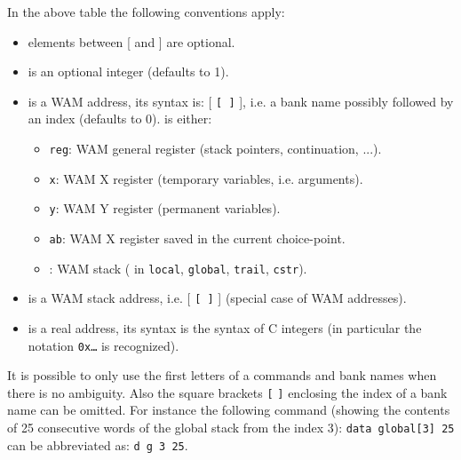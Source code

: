 In the above table the following conventions apply:

\begin{itemize}

\item elements between [ and ] are optional.

\item {} is an optional integer (defaults to 1).

\item {} is a WAM address, its syntax is:
 [ \texttt{[  ]} ], i.e. a bank name
possibly followed by an index (defaults to 0). 
is either:

\begin{itemize}

\item \texttt{reg}: WAM general register (stack pointers, continuation,
...).

\item \texttt{x}: WAM X register (temporary variables, i.e. arguments).

\item \texttt{y}: WAM Y register (permanent variables).

\item \texttt{ab}: WAM X register saved in the current choice-point.

\item {}: WAM stack
( in \texttt{local}, \texttt{global}, \texttt{trail},
\texttt{cstr}).

\end{itemize}

\item {} is a WAM stack address, i.e.
\texttt{} [ \texttt{[  ]} ] (special case of
WAM addresses).

\item {} is a real address, its syntax is the syntax of C
integers (in particular the notation \texttt{0x\ldots} is recognized).

\end{itemize}

It is possible to only use the first letters of a commands and bank names
when there is no ambiguity. Also the square brackets \texttt{[} \texttt{]}
enclosing the index of a bank name can be omitted. For instance the
following command (showing the contents of 25 consecutive words of the
global stack from the index 3): \texttt{data global[3] 25} can be
abbreviated as: \texttt{d g 3 25}.

